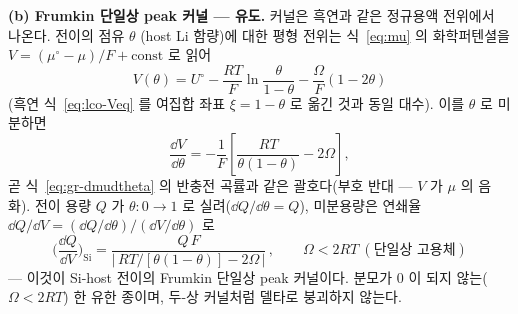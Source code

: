 \textbf{(b) Frumkin 단일상 peak 커널 --- 유도.} 커널은 흑연과 같은 정규용액 전위에서 나온다. 전이의 점유 $\theta$
(host Li 함량)에 대한 평형 전위는 식~\eqref{eq:mu} 의 화학퍼텐셜을 $V=(\mu^\circ-\mu)/F+\text{const}$ 로 읽어
\begin{equation}
V(\theta)=U^\circ-\frac{RT}{F}\ln\frac{\theta}{1-\theta}-\frac{\Omega}{F}(1-2\theta)
\label{eq:si-fr-V}
\end{equation}
(흑연 식~\eqref{eq:lco-Veq} 를 여집합 좌표 $\xi=1-\theta$ 로 옮긴 것과 동일 대수). 이를 $\theta$ 로 미분하면
\begin{equation}
\frac{\dd V}{\dd\theta}=-\frac1F\!\left[\frac{RT}{\theta(1-\theta)}-2\Omega\right],
\label{eq:si-fr-dVdtheta}
\end{equation}
곧 식~\eqref{eq:gr-dmudtheta} 의 반충전 곡률과 같은 괄호다(부호 반대 --- $V$ 가 $\mu$ 의 음화). 전이 용량 $Q$ 가
$\theta\!:\!0\!\to\!1$ 로 실려($\dd Q/\dd\theta=Q$), 미분용량은 연쇄율 $\dd Q/\dd V=(\dd Q/\dd\theta)/(\dd V/\dd\theta)$ 로
\begin{equation}
\boxed{\;\Big(\frac{\dd Q}{\dd V}\Big)_{\mathrm{Si}}
=\frac{Q\,F}{\big|\,RT/[\theta(1-\theta)]-2\Omega\,\big|}\,,\qquad \Omega<2RT\ (\text{단일상 고용체})\;}
\label{eq:si-fr-kernel}
\end{equation}
--- 이것이 Si-host 전이의 Frumkin 단일상 peak 커널이다\cite{leviaurbach1999}. 분모가 $0$ 이 되지 않는($\Omega<2RT$)
한 유한 종이며, 두-상 커널처럼 델타로 붕괴하지 않는다.


